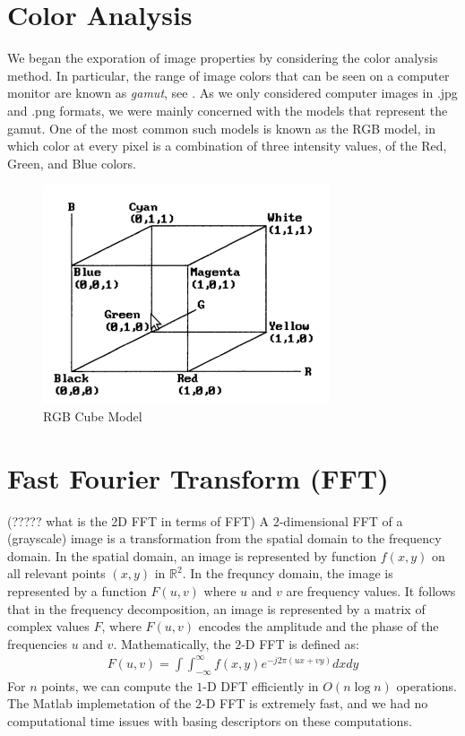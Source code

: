 \documentclass{report}
\begin{document}
\section{Color Analysis}
We began the exporation of image properties by considering the color analysis method. In particular, the range of image colors that can be seen on a computer monitor are known as \emph{gamut}, see \cite{color_model_ref}. As we only considered computer images in .jpg and .png formats, we were mainly concerned with the models that represent the gamut. One of the most common such models is known as the RGB model, in which color at every pixel is a combination of three intensity values, of the Red, Green, and Blue colors.  
\begin{figure}[hbtp]
\centering
\caption{RGB Cube Model}
\includegraphics[scale=0.5]{graphics/rgb_cube.png}
\end{figure}






\section{Fast Fourier Transform (FFT)} (????? what is the 2D FFT in terms of FFT)
A $2$-dimensional FFT of a (grayscale) image is a transformation from the spatial domain to the frequency domain. In the spatial domain, an image is represented by function $f(x,y)$ on all relevant points $(x,y)$ in  $\mathbb{R}^2$. In the frequncy domain, the image is represented by a function $F(u,v)$ where $u$ and $v$ are frequency values. It follows that in the frequency decomposition, an image is represented by a matrix of complex values $F$, where $F(u,v)$ encodes the amplitude and the phase of the frequencies $u$ and $v$. Mathematically, the $2$-D FFT is defined as:
\begin{eqnarray}
F(u,v) = \int \int ^{\infty}_{-\infty} f(x,y)e^{-j2\pi (ux+vy)}dx dy
\end{eqnarray}
For $n$ points, we can compute the $1$-D DFT efficiently in $O(n\log{n})$ operations. The Matlab implemetation of the $2$-D FFT is extremely  fast, and we had no computational time issues with basing descriptors on these computations.
\end{document}
